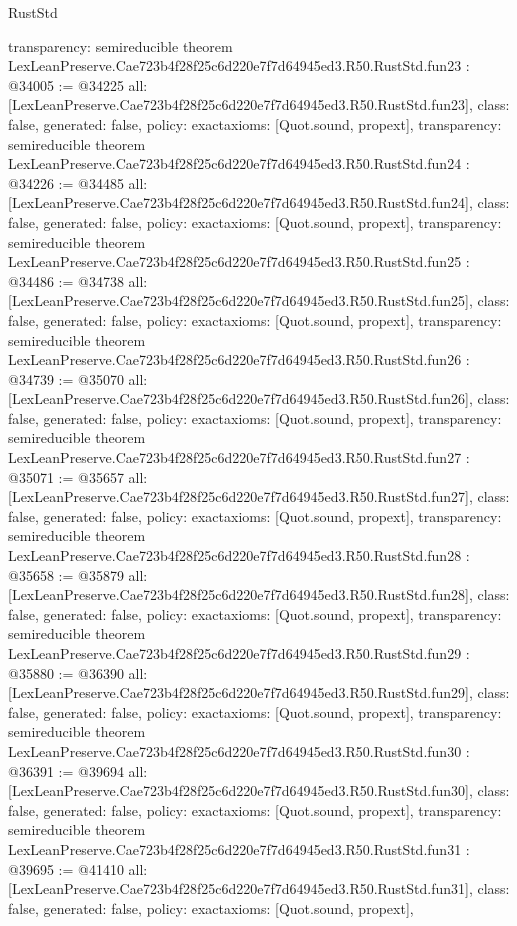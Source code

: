\begin{lexlean}{RustStd}
\begin{coremodule}
{  transparency: semireducible
}
theorem LexLeanPreserve.Cae723b4f28f25c6d220e7f7d64945ed3.R50.RustStd.fun23 : @34005 := @34225 {
  all: [LexLeanPreserve.Cae723b4f28f25c6d220e7f7d64945ed3.R50.RustStd.fun23],
  class: false,
  generated: false,
  policy: exact{axioms: [Quot.sound, propext]},
  transparency: semireducible
}
theorem LexLeanPreserve.Cae723b4f28f25c6d220e7f7d64945ed3.R50.RustStd.fun24 : @34226 := @34485 {
  all: [LexLeanPreserve.Cae723b4f28f25c6d220e7f7d64945ed3.R50.RustStd.fun24],
  class: false,
  generated: false,
  policy: exact{axioms: [Quot.sound, propext]},
  transparency: semireducible
}
theorem LexLeanPreserve.Cae723b4f28f25c6d220e7f7d64945ed3.R50.RustStd.fun25 : @34486 := @34738 {
  all: [LexLeanPreserve.Cae723b4f28f25c6d220e7f7d64945ed3.R50.RustStd.fun25],
  class: false,
  generated: false,
  policy: exact{axioms: [Quot.sound, propext]},
  transparency: semireducible
}
theorem LexLeanPreserve.Cae723b4f28f25c6d220e7f7d64945ed3.R50.RustStd.fun26 : @34739 := @35070 {
  all: [LexLeanPreserve.Cae723b4f28f25c6d220e7f7d64945ed3.R50.RustStd.fun26],
  class: false,
  generated: false,
  policy: exact{axioms: [Quot.sound, propext]},
  transparency: semireducible
}
theorem LexLeanPreserve.Cae723b4f28f25c6d220e7f7d64945ed3.R50.RustStd.fun27 : @35071 := @35657 {
  all: [LexLeanPreserve.Cae723b4f28f25c6d220e7f7d64945ed3.R50.RustStd.fun27],
  class: false,
  generated: false,
  policy: exact{axioms: [Quot.sound, propext]},
  transparency: semireducible
}
theorem LexLeanPreserve.Cae723b4f28f25c6d220e7f7d64945ed3.R50.RustStd.fun28 : @35658 := @35879 {
  all: [LexLeanPreserve.Cae723b4f28f25c6d220e7f7d64945ed3.R50.RustStd.fun28],
  class: false,
  generated: false,
  policy: exact{axioms: [Quot.sound, propext]},
  transparency: semireducible
}
theorem LexLeanPreserve.Cae723b4f28f25c6d220e7f7d64945ed3.R50.RustStd.fun29 : @35880 := @36390 {
  all: [LexLeanPreserve.Cae723b4f28f25c6d220e7f7d64945ed3.R50.RustStd.fun29],
  class: false,
  generated: false,
  policy: exact{axioms: [Quot.sound, propext]},
  transparency: semireducible
}
theorem LexLeanPreserve.Cae723b4f28f25c6d220e7f7d64945ed3.R50.RustStd.fun30 : @36391 := @39694 {
  all: [LexLeanPreserve.Cae723b4f28f25c6d220e7f7d64945ed3.R50.RustStd.fun30],
  class: false,
  generated: false,
  policy: exact{axioms: [Quot.sound, propext]},
  transparency: semireducible
}
theorem LexLeanPreserve.Cae723b4f28f25c6d220e7f7d64945ed3.R50.RustStd.fun31 : @39695 := @41410 {
  all: [LexLeanPreserve.Cae723b4f28f25c6d220e7f7d64945ed3.R50.RustStd.fun31],
  class: false,
  generated: false,
  policy: exact{axioms: [Quot.sound, propext]},
}
\end{coremodule}
\end{lexlean}
